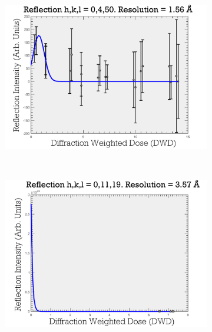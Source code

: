 \begin{figure}
        \centering
        \begin{subfigure}[b]{1\textwidth}
                \centering
                \includegraphics[width=\textwidth]{figures/zde/ReflectionPlot_h,k,l_0,4,50_fit_to_small_values.pdf}
                \caption{}
                \label{fig:Data overfitting to small values - Extrapolation method}
        \end{subfigure}
				\\
        \begin{subfigure}[b]{1\textwidth}
                \centering
                \includegraphics[width=\textwidth]{figures/zde/ReflectionPlot_h,k,l_0,11,19_zero_dose_too_high.pdf}
                \caption{}
                \label{fig:Unphysically high zero-dose intensity - Extrapolation method}

\end{subfigure}
\end{figure}
